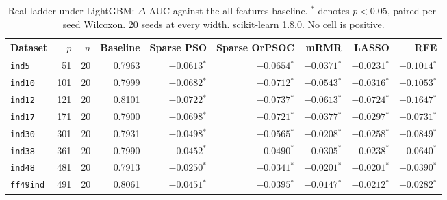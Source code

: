 \begin{table}[htbp]
    \centering
    \small\setlength{\tabcolsep}{4pt}
    \begin{tabular}{lrrrrrrrr}
    \hline
    Dataset & $p$ & $n$ & Baseline & Sparse PSO & Sparse OrPSOC & mRMR & LASSO & RFE \\
    \hline
    \texttt{ind5} & 51 & 20 & 0.7963 & $-0.0613$$^{*}$ & $-0.0654$$^{*}$ & $-0.0371$$^{*}$ & $-0.0231$$^{*}$ & $-0.1014$$^{*}$ \\
    \texttt{ind10} & 101 & 20 & 0.7999 & $-0.0682$$^{*}$ & $-0.0712$$^{*}$ & $-0.0543$$^{*}$ & $-0.0316$$^{*}$ & $-0.1053$$^{*}$ \\
    \texttt{ind12} & 121 & 20 & 0.8101 & $-0.0722$$^{*}$ & $-0.0737$$^{*}$ & $-0.0613$$^{*}$ & $-0.0724$$^{*}$ & $-0.1647$$^{*}$ \\
    \texttt{ind17} & 171 & 20 & 0.7900 & $-0.0698$$^{*}$ & $-0.0721$$^{*}$ & $-0.0377$$^{*}$ & $-0.0297$$^{*}$ & $-0.0731$$^{*}$ \\
    \texttt{ind30} & 301 & 20 & 0.7931 & $-0.0498$$^{*}$ & $-0.0565$$^{*}$ & $-0.0208$$^{*}$ & $-0.0258$$^{*}$ & $-0.0849$$^{*}$ \\
    \texttt{ind38} & 361 & 20 & 0.7990 & $-0.0452$$^{*}$ & $-0.0490$$^{*}$ & $-0.0305$$^{*}$ & $-0.0238$$^{*}$ & $-0.0640$$^{*}$ \\
    \texttt{ind48} & 481 & 20 & 0.7913 & $-0.0250$$^{*}$ & $-0.0341$$^{*}$ & $-0.0201$$^{*}$ & $-0.0201$$^{*}$ & $-0.0390$$^{*}$ \\
    \texttt{ff49ind} & 491 & 20 & 0.8061 & $-0.0451$$^{*}$ & $-0.0395$$^{*}$ & $-0.0147$$^{*}$ & $-0.0212$$^{*}$ & $-0.0282$$^{*}$ \\
    \hline
    \end{tabular}
    \caption{Real ladder under LightGBM: $\Delta$ AUC against the all-features baseline. $^{*}$ denotes $p < 0.05$, paired per-seed Wilcoxon. 20 seeds at every width. scikit-learn 1.8.0. No cell is positive.}
    \label{tab:dimreal_lgbm}
\end{table}
